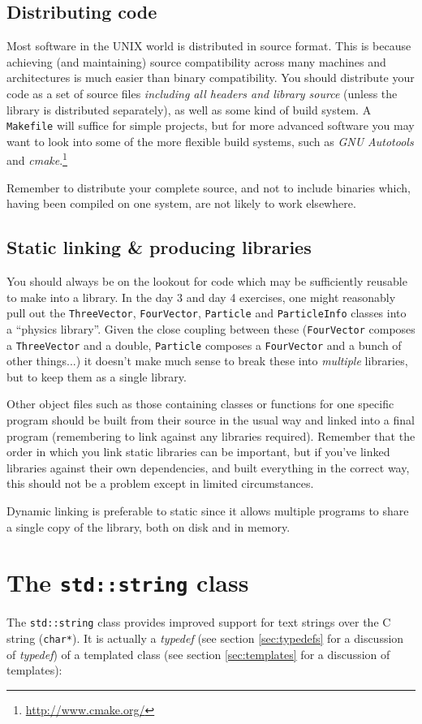 \documentclass[a4paper]{scrartcl}
\begin{document}
\subsection{Distributing code}
Most software in the UNIX world is distributed in source format. This is because achieving (and maintaining) source compatibility across many machines and architectures is much easier than binary compatibility. You should distribute your code as a set of source files \emph{including all headers and library source} (unless the library is distributed separately), as well as some kind of build system. A \verb|Makefile| will suffice for simple projects, but for more advanced software you may want to look into some of the more flexible build systems, such as \emph{GNU Autotools}\cite{Autobook} and \emph{cmake}.\footnote{\url{http://www.cmake.org/}}

Remember to distribute your complete source, and not to include binaries which, having been compiled on one system, are not likely to work elsewhere.

\subsection{Static linking \& producing libraries}
You should always be on the lookout for code which may be sufficiently reusable to make into a library. In the day 3 and day 4 exercises, one might reasonably pull out the \verb|ThreeVector|, \verb|FourVector|, \verb|Particle| and \verb|ParticleInfo| classes into a ``physics library''. Given the close coupling between these (\verb|FourVector| composes a \verb|ThreeVector| and a double, \verb|Particle| composes a \verb|FourVector| and a bunch of other things...) it doesn't make much sense to break these into \emph{multiple} libraries, but to keep them as a single library.

Other object files such as those containing classes or functions for one specific program should be built from their source in the usual way and linked into a final program (remembering to link against any libraries required). Remember that the order in which you link static libraries can be important, but if you've linked libraries against their own dependencies, and built everything in the correct way, this should not be a problem except in limited circumstances.

Dynamic linking is preferable to static since it allows multiple programs to share a single copy of the library, both on disk and in memory.

\section{The \texttt{std::string} class}\label{sec:string}
The \texttt{std::string} class provides improved support for text strings over the C string (\texttt{char*}). It is actually a \emph{typedef} (see section \ref{sec:typedefs} for a discussion of \emph{typedef}) of a templated class (see section \ref{sec:templates} for a discussion of templates):

\end{document}
